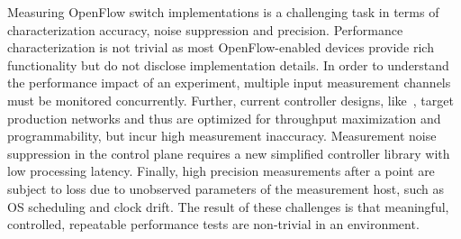 Measuring OpenFlow switch implementations is a challenging task in terms of
characterization accuracy, noise suppression and precision.  Performance
characterization is not trivial as most OpenFlow-enabled devices provide rich
functionality but do not disclose implementation details. In order to understand
the performance impact of an experiment, multiple input measurement channels
must be monitored concurrently. Further, current controller designs,
like~\cite{Gude08,SNAC}, target production networks and thus are optimized for
throughput maximization and programmability, but incur high measurement
inaccuracy. Measurement noise suppression in the control plane requires a new
simplified \of controller library with low processing latency. Finally, high
precision measurements after a point are subject to loss due to unobserved
parameters of the measurement host, such as OS scheduling and clock drift. The
result of these challenges is that meaningful, controlled, repeatable
performance tests are non-trivial in an \of environment.



